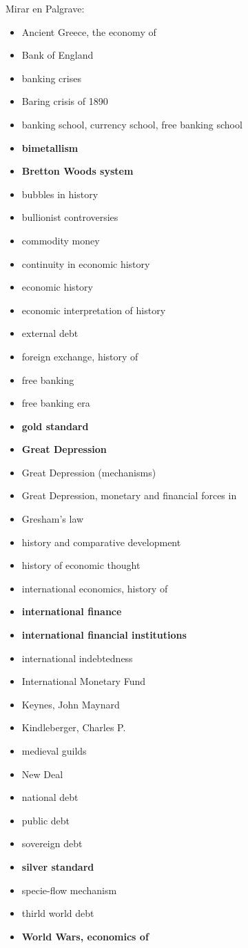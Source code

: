 \documentclass{nuevotema}
\begin{document}
Mirar en Palgrave:
\begin{itemize}
	\item Ancient Greece, the economy of
	\item Bank of England
	\item banking crises
	\item Baring crisis of 1890
	\item banking school, currency school, free banking school
	\item \textbf{bimetallism}
	\item \textbf{Bretton Woods system}
	\item bubbles in history
	\item bullionist controversies
	\item commodity money
	\item continuity in economic history
	\item economic history
	\item economic interpretation of history
	\item external debt
	\item foreign exchange, history of
	\item free banking
	\item free banking era
	\item \textbf{gold standard}
	\item \textbf{Great Depression}
	\item Great Depression (mechanisms)
	\item Great Depression, monetary and financial forces in
	\item Gresham's law
	\item history and comparative development
	\item history of economic thought
	\item international economics, history of
	\item \textbf{international finance}
	\item \textbf{international financial institutions}
	\item international indebtedness
	\item International Monetary Fund
	\item Keynes, John Maynard
	\item Kindleberger, Charles P.
	\item medieval guilds
	\item New Deal
	\item national debt
	\item public debt
	\item sovereign debt
	\item \textbf{silver standard}
	\item specie-flow mechanism
	\item thirld world debt
	\item \textbf{World Wars, economics of}
\end{itemize}
\end{document}

